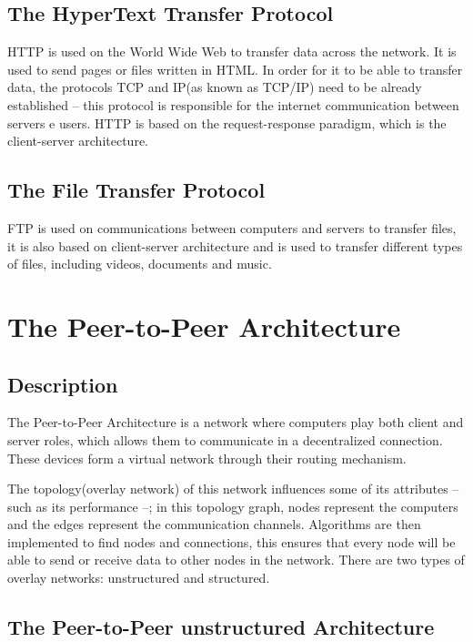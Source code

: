 \documentclass[12pt,a4paper]{article}
\begin{document}
\subsection{The HyperText Transfer Protocol}

HTTP\cite{http} is used on the World Wide Web to transfer data across the network. It is used to send pages or files written in HTML. In order for it to be able to transfer data, the protocols TCP and IP(as known as TCP/IP) need to be already established -- this protocol is responsible for the internet communication between servers e users. HTTP is based on the request-response paradigm, which is the client-server architecture.

\subsection{The File Transfer Protocol}

FTP\cite{ftp}\cite{ftp2} is used on communications between computers and servers to transfer files, it is also based on client-server architecture and is used to transfer different types of files, including videos, documents and music.



\section{The Peer-to-Peer Architecture \label{Peer-to-Peer Architecture}}

\subsection{Description}

The Peer-to-Peer Architecture \cite{definitionp2p}\cite{definitionp2p2} is a network where computers play both client and server roles, which allows them to communicate in a decentralized connection. These devices form a virtual network through their routing mechanism.

The topology(overlay network) of this network influences some of its attributes -- such as its performance --; in this topology graph, nodes represent the computers and the edges represent the communication channels. Algorithms are then implemented to find nodes and connections, this ensures that every node will be able to send or receive data to other nodes in the network. There are two types of overlay networks: unstructured and structured.

\subsection{The Peer-to-Peer unstructured Architecture}
\end{document}
